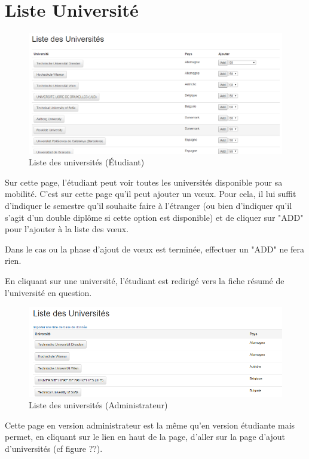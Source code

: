 \newpage
\section{Liste Université}

\bigbreak

\begin{figure}[H]
	\includegraphics[scale=0.35]{images/LUS.png}
	\caption{Liste des universités (Étudiant)}
	\label{fig::lus}
\end{figure}

Sur cette page, l'étudiant peut voir toutes les universités disponible pour sa mobilité. C'est sur cette page qu'il peut ajouter un vœux. Pour cela, il lui suffit d'indiquer le semestre qu'il souhaite faire à l'étranger (ou bien d'indiquer qu'il s'agit d'un double diplôme si cette option est disponible) et de cliquer sur "ADD" pour l'ajouter à la liste des vœux.

\bigbreak

Dans le cas ou la phase d'ajout de vœux est terminée, effectuer un "ADD" ne fera rien.

\bigbreak

En cliquant sur une université, l'étudiant est redirigé vers la fiche résumé de l'université en question.

\begin{figure}[H]
	\includegraphics[scale=0.7]{images/LUA.png}
	\caption{Liste des universités  (Administrateur)}
	\label{fig::lua}
\end{figure}

Cette page en version administrateur est la même qu'en version étudiante mais permet, en cliquant sur le lien en haut de la page, d'aller sur la page d'ajout d'universités (cf figure ??). 